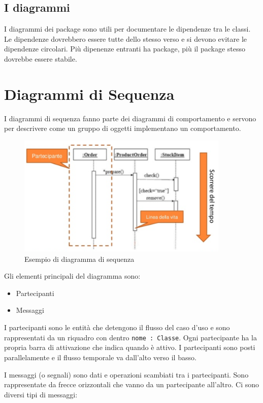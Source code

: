\subsection{I diagrammi}

I diagrammi dei package sono utili per documentare le dipendenze tra le classi. 
Le dipendenze dovrebbero essere tutte dello stesso verso e si devono evitare le dipendenze circolari. 
Più dipenenze entranti ha package, più il package stesso dovrebbe essere stabile.

\section{Diagrammi di Sequenza}
I diagrammi di sequenza fanno parte dei diagrammi di comportamento e servono per descrivere come un gruppo di oggetti implementano un comportamento.

\begin{figure}[H]
\centering
    \includegraphics[width=0.9\textwidth]{res/img/esempioDiagrammaSequenza}
    \caption{Esempio di diagramma di sequenza}
\end{figure}

Gli elementi principali del diagramma sono:
\begin{itemize}
\item Partecipanti
\item Messaggi
\end{itemize}

I partecipanti sono le entità che detengono il flusso del caso d'uso e sono rappresentati da un riquadro con dentro \texttt{nome : Classe}.
Ogni partecipante ha la propria barra di attivazione che indica quando è attivo.
I partecipanti sono posti parallelamente e il flusso temporale va dall'alto verso il basso.

I messaggi (o segnali) sono dati e operazioni scambiati tra i partecipanti. 
Sono rappresentate da frecce orizzontali che vanno da un partecipante all'altro. Ci sono diversi tipi di messaggi:

